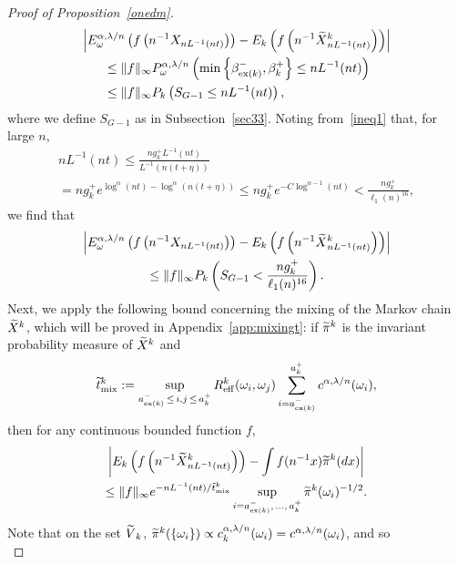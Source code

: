 \documentclass[AHL,Unicode,longabstracts,published]{cedram}
\newcommand{\mix}{\mathrm{mix}}
\newcommand{\eff}{\mathrm{eff}}
\newcommand\ex{\operatorname{ex}}
\newcommand{\aat}[1]{a_{\ex(#1)}^-}
\newcommand{\betat}[1]{\beta^-_{\ex(#1)}}
\newcommand{\B}{{16}}
\let\oldtilde\tilde
\renewcommand*{\tilde}[1]{\mathchoice{\widetilde{#1}}{\widetilde{#1}}{\oldtilde{#1}}{\oldtilde{#1}}}
\begin{document}
\begin{proof}[Proof of Proposition~\ref{onedm}]
\begin{multline*}
\left|{E}^{\alpha,\lambda/n}_\omega\left(f\left(n^{-1}{X}_{nL^{-1}(nt)}\right)\right)-E_k\left(f\left(n^{-1}\tilde{X}^k_{nL^{-1}(nt)}\right)\right)\right|\\
\begin{aligned}
&\leq \|f\|_\infty{P}^{\alpha,\lambda/n}_\omega\left(\min\left\{\betat{k},{\beta}_k^+\right\}\leq nL^{-1}(nt)\right)\\
&\leq \|f\|_\infty{P}_k\left(S_{G-1}\leq nL^{-1}(nt)\right),
\end{aligned}
\end{multline*}
where we define $S_{G-1}$ as in Subsection~\ref{sec33}. Noting from~\eqref{ineq1} that, for large $n$,
\begin{multline}\label{lntbound}
nL^{-1}(nt)\leq\frac{ng_k^+L^{-1}(nt)}{L^{-1}(n(t+\eta))}\\
=ng_k^+e^{\log^\alpha(nt)-\log^\alpha(n(t+\eta))}\leq ng_k^+e^{-C\log^{\alpha-1}(nt)}< \frac{ng_k^+}{\ell_1(n)^{\B}},
\end{multline}
we find that
\begin{multline}\label{abound}
\left|{E}^{\alpha,\lambda/n}_\omega\left(f\left(n^{-1}{X}_{nL^{-1}(nt)}\right)\right)-E_k\left(f\left(n^{-1}\tilde{X}^k_{nL^{-1}(nt)}\right)\right)\right|\\
\leq\|f\|_\infty{P}_k\left(S_{G-1}<\frac{ng_k^+}{\ell_1(n)^{\B}}\right).
\end{multline}
Next, we apply the following bound concerning the mixing of the Markov chain $\tilde{X}^k$, which will be proved in Appendix~\ref{app:mixingt}: if $\tilde{\pi}^k$ is the invariant probability measure of $\tilde{X}^k$ and
\begin{align*}
\tilde{t}^k_{\mix}:=\sup_{\aat{k}\,\leq\,i,j\,\leq\,a_k^+}R_\eff^k(\omega_i,\omega_j) \sum_{i=\aat{k}}^{a_k^+}c^{\alpha,\lambda/n}(\omega_i),
\end{align*}
then for any continuous bounded function $f$,
\begin{multline}\label{mixingt}
\left|E_k\left(f\left(n^{-1}\tilde{X}^k_{nL^{-1}(nt)}\right)\right)-\int f(n^{-1}x)\tilde{\pi}^k(dx)\right|\\
\leq \|f\|_\infty e^{-nL^{-1}(nt)/\tilde{t}^k_{\mix}}\sup_{i=\aat{k},\,\dots,\,a_k^+} \tilde \pi^k(\omega_i)^{-1/2}.
\end{multline}
Note that on the set $\tilde{V}_k$, $\tilde{\pi}^k(\{\omega_i\})\propto c^{\alpha,\lambda/n}_k(\omega_i)= c^{\alpha,\lambda/n}(\omega_i)$, and so
\begin{equation}\label{measureeq}

\end{equation}
\end{proof}
\end{document}
